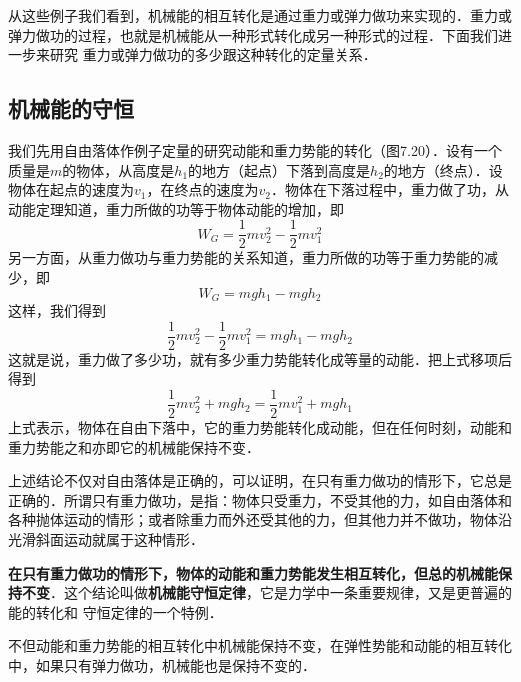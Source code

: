 从这些例子我们看到，机械能的相互转化是通过重力或弹力做功来实现的．重力或弹力做功的过程，也就是机械能从一种形式转化成另一种形式的过程．下面我们进一步来研究
重力或弹力做功的多少跟这种转化的定量关系．

\subsection{机械能的守恒}
\begin{figure}[H]\centering
    \caption{}
\end{figure}

我们先用自由落体作例子定量的研究动能和重力势能的转化（图7.20）．设有一个质量是$m$的物体，从高度是$h_1$的地方（起点）下落到高度是$h_2$的地方（终点）．设
物体在起点的速度为$v_1$，在终点的速度为$v_2$．物体在下落过程中，重力做了功，从动能定理知道，重力所做的功等于物体动能的增加，即
\[W_G=\frac{1}{2}mv_2^2-\frac{1}{2}mv^2_1 \]
另一方面，从重力做功与重力势能的关系知道，重力所做的功等于重力势能的减少，即
\[W_G=mgh_1-mgh_2\]
这样，我们得到
\[\frac{1}{2}mv_2^2-\frac{1}{2}mv^2_1 =mgh_1-mgh_2\]
这就是说，重力做了多少功，就有多少重力势能转化成等量的动能．把上式移项后得到
\[ \frac{1}{2}mv^2_2 +mgh_2=\frac{1}{2}mv^2_1 +mgh_1\]
上式表示，物体在自由下落中，它的重力势能转化成动能，但在任何时刻，动能和重力势能之和亦即它的机械能保持不变．

上述结论不仅对自由落体是正确的，可以证明，在只有重力做功的情形下，它总是正确的．所谓只有重力做功，是指：物体只受重力，不受其他的力，如自由落体和各种抛体运动的情形；或者除重力而外还受其他的力，但其他力并不做功，物体沿光滑斜面运动就属于这种情形．

\textbf{在只有重力做功的情形下，物体的动能和重力势能发生相互转化，但总的机械能保持不变}．这个结论叫做\textbf{机械能守恒定律}，它是力学中一条重要规律，又是更普遍的能的转化和
守恒定律的一个特例．

不但动能和重力势能的相互转化中机械能保持不变，在弹性势能和动能的相互转化中，如果只有弹力做功，机械能也是保持不变的．

